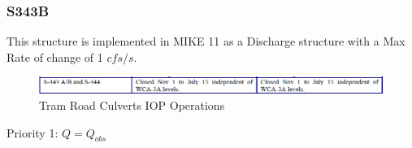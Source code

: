 \clearpage

\subsubsection{S343B}

This structure is implemented in MIKE 11 as a Discharge structure with a Max Rate of change of 1 $cfs/s$.

\begin{figure}[!h]
  \begin{center}
  \includegraphics[width=6.5in]{../figs/S343-S344_IOPops.png}
  \caption{Tram Road Culverts IOP Operations}
  \label{fig:343iop}
  \end{center}
\end{figure}


\begin{packed_items}
\item Priority 1: $Q = Q_{obs}$
\end{packed_items}

%
%
%

